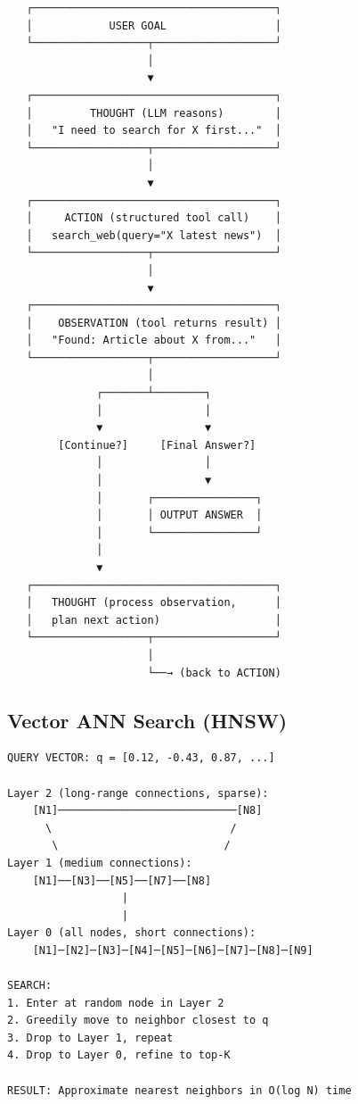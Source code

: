\documentclass[11pt]{article}
\begin{document}
\begin{verbatim}
   ┌──────────────────────────────────────┐
   │            USER GOAL                 │
   └──────────────────┬───────────────────┘
                      │
                      ▼
   ┌──────────────────────────────────────┐
   │         THOUGHT (LLM reasons)        │
   │   "I need to search for X first..."  │
   └──────────────────┬───────────────────┘
                      │
                      ▼
   ┌──────────────────────────────────────┐
   │     ACTION (structured tool call)    │
   │   search_web(query="X latest news")  │
   └──────────────────┬───────────────────┘
                      │
                      ▼
   ┌──────────────────────────────────────┐
   │    OBSERVATION (tool returns result) │
   │   "Found: Article about X from..."   │
   └──────────────────┬───────────────────┘
                      │
              ┌───────┴────────┐
              │                │
              ▼                ▼
        [Continue?]     [Final Answer?]
              │                │
              │                ▼
              │       ┌────────────────┐
              │       │ OUTPUT ANSWER  │
              │       └────────────────┘
              │
              ▼
   ┌──────────────────────────────────────┐
   │   THOUGHT (process observation,      │
   │   plan next action)                  │
   └──────────────────┬───────────────────┘
                      │
                      └──→ (back to ACTION)
\end{verbatim}

\subsection{Vector ANN Search (HNSW)}\label{vector-ann-search-hnsw}

\setcodelang{}

\begin{verbatim}
QUERY VECTOR: q = [0.12, -0.43, 0.87, ...]

Layer 2 (long-range connections, sparse):
    [N1]────────────────────────────[N8]
      \                            /
       \                          /
Layer 1 (medium connections):
    [N1]──[N3]──[N5]──[N7]──[N8]
                  |
                  |
Layer 0 (all nodes, short connections):
    [N1]─[N2]─[N3]─[N4]─[N5]─[N6]─[N7]─[N8]─[N9]

SEARCH:
1. Enter at random node in Layer 2
2. Greedily move to neighbor closest to q
3. Drop to Layer 1, repeat
4. Drop to Layer 0, refine to top-K

RESULT: Approximate nearest neighbors in O(log N) time
\end{verbatim}
\end{document}
